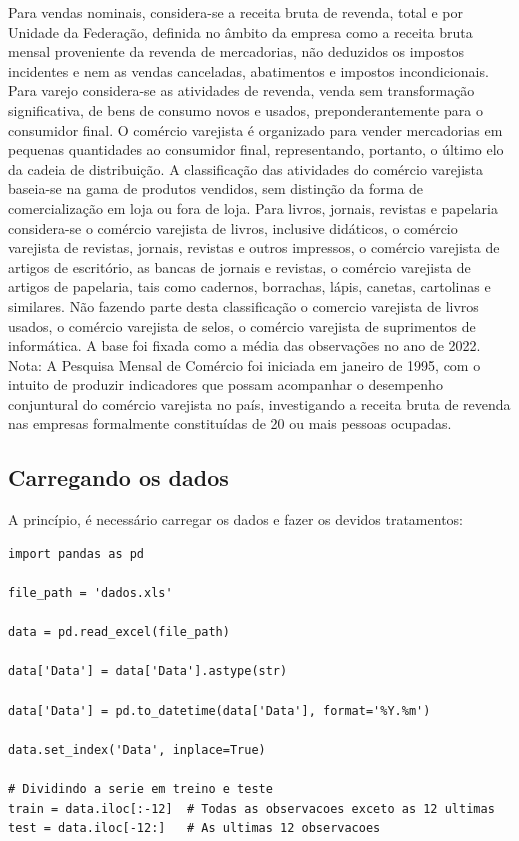 \documentclass[a4paper, 12pt]{article}
\begin{document}
Para vendas nominais, considera-se a receita bruta de revenda, total e por Unidade da Federação, definida no âmbito da empresa como a receita bruta mensal proveniente da revenda de mercadorias, não deduzidos os impostos incidentes e nem as vendas canceladas, abatimentos e impostos incondicionais. Para varejo considera-se as atividades de revenda, venda sem transformação significativa, de bens de consumo novos e usados, preponderantemente para o consumidor final. O comércio varejista é organizado para vender mercadorias em pequenas quantidades ao consumidor final, representando, portanto, o último elo da cadeia de distribuição. A classificação das atividades do comércio varejista baseia-se na gama de produtos vendidos, sem distinção da forma de comercialização em loja ou fora de loja. Para livros, jornais, revistas e papelaria considera-se o comércio varejista de livros, inclusive didáticos, o comércio varejista de revistas, jornais, revistas e outros impressos, o comércio varejista de artigos de escritório, as bancas de jornais e revistas, o comércio varejista de artigos de papelaria, tais como cadernos, borrachas, lápis, canetas, cartolinas e similares. Não fazendo parte desta classificação o comercio varejista de livros usados, o comércio varejista de selos, o comércio varejista de suprimentos de informática. A base foi fixada como a média das observações no ano de 2022. Nota: A Pesquisa Mensal de Comércio foi iniciada em janeiro de 1995, com o intuito de produzir indicadores que possam acompanhar o desempenho conjuntural do comércio varejista no país, investigando a receita bruta de revenda nas empresas formalmente constituídas de 20 ou mais pessoas ocupadas.\\

\newpage
\subsection{Carregando os dados}
A princípio, é necessário carregar os dados e fazer os devidos tratamentos:

\begin{lstlisting}[style=python]
import pandas as pd

file_path = 'dados.xls' 

data = pd.read_excel(file_path)

data['Data'] = data['Data'].astype(str)

data['Data'] = pd.to_datetime(data['Data'], format='%Y.%m')

data.set_index('Data', inplace=True)

# Dividindo a serie em treino e teste
train = data.iloc[:-12]  # Todas as observacoes exceto as 12 ultimas
test = data.iloc[-12:]   # As ultimas 12 observacoes

\end{lstlisting} \\
\end{document}
